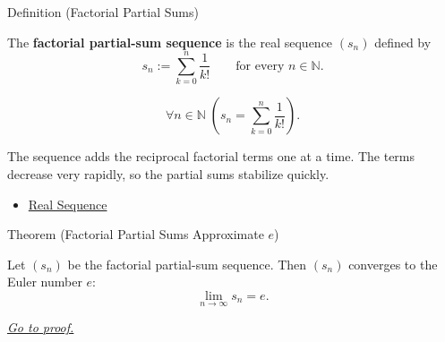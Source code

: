 
\begin{definitionbox}{Definition (Factorial Partial Sums)}
\begin{definition}
\label{def:factorial-partial-sums}
The \textbf{factorial partial-sum sequence} is the real sequence $(s_n)$
defined by
\[
  s_n:=\sum_{k=0}^{n}\frac{1}{k!}
  \qquad\text{for every } n\in\mathbb{N}.
\]
\end{definition}
\end{definitionbox}

\begin{remark*}
\[
\forall n\in\mathbb{N}\;
\left(
  s_n=\sum_{k=0}^{n}\frac{1}{k!}
\right).
\]
\end{remark*}

\begin{remark*}[Interpretation]
The sequence adds the reciprocal factorial terms one at a time. The terms
decrease very rapidly, so the partial sums stabilize quickly.
\end{remark*}

\begin{dependencies}
\begin{itemize}
  \item \hyperref[def:real-sequence]{Real Sequence}
\end{itemize}
\end{dependencies}


\begin{theorembox}{Theorem (Factorial Partial Sums Approximate $e$)}
\begin{theorem}
\label{thm:factorial-partial-sums-approximate-e}
Let $(s_n)$ be the factorial partial-sum sequence. Then $(s_n)$ converges
to the Euler number $e$:
\[
  \lim_{n\to\infty}s_n=e.
\]

\smallskip
\noindent
\hyperref[prf:factorial-partial-sums-approximate-e]{\textit{Go to proof.}}
\end{theorem}
\end{theorembox}

